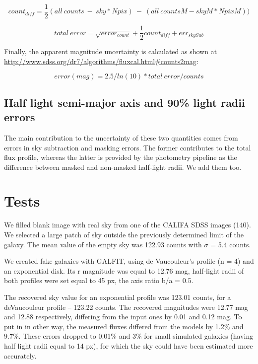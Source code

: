 \documentclass[apj, onecolumn]{emulateapj}
\begin{document}
\begin{equation}
count_{diff} = \frac{1}{2}(all\ counts\ -\ sky*Npix)\ -\ (all\ countsM - skyM*NpixM))
\end{equation}

\begin{equation}
total\ error = \sqrt{error_{count}} + \frac{1}{2} count_{diff} + err_{skySub}
\end{equation}

Finally, the apparent magnitude uncertainty is calculated as shown at \url{http://www.sdss.org/dr7/algorithms/fluxcal.html#counts2mag}:

\begin{equation}
error(mag) = 2.5 / ln(10) * total\ error / counts
\end{equation}

\subsection{Half light semi-major axis and 90\% light radii errors}

The main contribution to the uncertainty of these two quantities comes from errors in sky subtraction and masking errors. The former contributes to the total flux profile, whereas the latter is provided by the photometry pipeline as the difference between masked and non-masked half-light radii. We add them too.


\FloatBarrier
\section*{Tests}
We filled blank image with real sky from one of the CALIFA SDSS images (140). We selected a large patch of sky outside the previously determined limit of the galaxy. The mean value of the empty sky was 122.93 counts with $\sigma$ = 5.4 counts.

We created fake galaxies with GALFIT, using de Vaucouleur's profile (n = 4) and an exponential disk. Its r magnitude was equal to 12.76 mag, half-light radii of both profiles were set equal to 45 px, the axis ratio b/a = 0.5. 

The recovered sky value for an exponential profile was 123.01 counts, for a deVaucouleur profile -- 123.22 counts. The recovered magnitudes were 12.77 mag and 12.88 respectively, differing from the input ones by 0.01 and 0.12 mag. To put in in other way, the measured fluxes differed from the models by 1.2\% and 9.7\%. These errors dropped to 0.01\% and 3\% for small simulated galaxies (having half light radii equal to 14 px), for which the sky could have been estimated more accurately.
\end{document}
